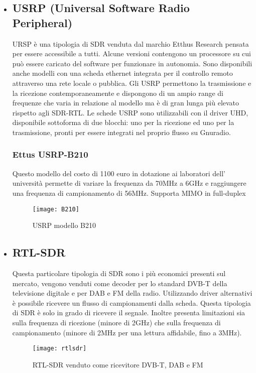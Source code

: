 \begin{itemize}
\begin{figure}[h]
\begin{minipage}[b]{.4\columnwidth}
	\end{minipage}\hfill
\end{figure}
\newpage
\item \subsection{USRP (Universal Software Radio Peripheral)} URSP è una tipologia di SDR venduta dal marchio Etthus Research pensata per essere accessibile a tutti. Alcune versioni contengono un processore su cui può essere caricato del software per funzionare in autonomia. Sono disponibili anche modelli con una scheda ethernet integrata per il controllo remoto attraverso una rete locale o pubblica. Gli USRP permettono la trasmissione e la ricezione contemporaneamente e dispongono di un ampio range di frequenze che varia in relazione al modello ma è di gran lunga più elevato rispetto agli SDR-RTL. Le schede USRP sono utilizzabili con il driver UHD, disponibile sottoforma di due blocchi: uno per la ricezione ed uno per la trasmissione, pronti per essere integrati nel proprio flusso su Gnuradio.
\subsubsection{Ettus USRP-B210}
Questo modello del costo di 1100 euro in dotazione ai laboratori dell' università permette di variare la frequenza da 70MHz a 6GHz e raggiungere una frequenza di campionamento di 56MHz. Supporta MIMO in full-duplex
\begin{figure}[h]
	\centering
	\texttt{[image: B210]}
	\caption{USRP modello B210\cite{b210}}\label{fig:1}
\end{figure}

\item \subsection{RTL-SDR} Questa particolare tipologia di SDR sono i più economici presenti sul mercato, vengono venduti come decoder per lo standard DVB-T della televisione digitale e per DAB e FM della radio. Utilizzando driver alternativi è possibile ricevere un flusso di campionamenti dalla scheda. Questa tipologia di SDR è solo in grado di ricevere il segnale. Inoltre presenta limitazioni sia sulla frequenza di ricezione (minore di 2GHz) che sulla frequenza di campionamento (minore di 2MHz per una lettura affidabile, fino a 3MHz).
\begin{figure}[h]
	\centering
	\texttt{[image: rtlsdr]}
	\caption{RTL-SDR venduto come ricevitore DVB-T, DAB e FM\cite{rtlsdr}}\label{fig:1}
\end{figure}


\end{itemize}
